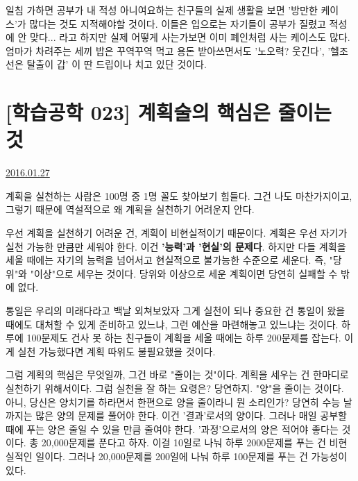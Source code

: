 일침 가하면 공부가 내 적성 아니여요하는 친구들의 실제 생활을 보면 '방만한 케이스'가 많다는 것도 지적해야할 것이다.
이들은 입으로는 자기들이 공부가 질렸고 적성에 안 맞다... 라고 하지만 실제 어떻게 사는가보면 이미 폐인처럼 사는 케이스도 많다.
엄마가 차려주는 세끼 밥은 꾸역꾸역 먹고 용돈 받아쓰면서도 '노오력? 웃긴다', '헬조선은 탈출이 갑' 이 딴 드립이나 치고 있단 것이다.
\vspace{5mm}





\section{[학습공학 023] 계획술의 핵심은 줄이는 것}
\href{https://www.kockoc.com/Apoc/611403}{2016.01.27}

\vspace{5mm}

계획을 실천하는 사람은 100명 중 1명 꼴도 찾아보기 힘들다.
그건 나도 마찬가지이고, 그렇기 때문에 역설적으로 왜 계획을 실천하기 어려운지 안다.
\vspace{5mm}

우선 계획을 실천하기 어려운 건, 계획이 비현실적이기 때문이다.
계획은 우선 자기가 실천 가능한 만큼만 세워야 한다. 이건 \textbf{'능력'과 '현실'의 문제다}.
하지만 다들 계획을 세울 때에는 자기의 능력을 넘어서고 현실적으로 불가능한 수준으로 세운다.
즉, "당위"와 "이상"으로 세우는 것이다.
당위와 이상으로 세운 계획이면 당연히 실패할 수 밖에 없다.
\vspace{5mm}

통일은 우리의 미래다라고 백날 외쳐보았자 그게 실천이 되나
중요한 건 통일이 왔을 때에도 대처할 수 있게 준비하고 있느냐, 그런 예산을 마련해놓고 있느냐는 것이다.
하루에 100문제도 건사 못 하는 친구들이 계획을 세울 때에는 하루 200문제를 잡는다.
이게 실천 가능했다면 계획 따위도 불필요했을 것이다.
\vspace{5mm}

그럼 계획의 핵심은 무엇일까, 그건 바로 "줄이는 것"이다.
계획을 세우는 건 한마디로 실천하기 위해서이다. 그럼 실천을 잘 하는 요령은?
당연하지. "양"을 줄이는 것이다.
아니, 당신은 양치기를 하라면서 한편으로 양을 줄이라니 뭔 소리인가?
당연히 수능 날까지는 많은 양의 문제를 풀어야 한다. 이건 '결과'로서의 양이다.
그러나 매일 공부할 때에 푸는 양은 줄일 수 있을 만큼 줄여야 한다. '과정'으로서의 양은 적어야 좋다는 것이다.
총 20,000문제를 푼다고 하자. 이걸 10일로 나눠 하루 2000문제를 푸는 건 비현실적인 일이다.
그러나 20,000문제를 200일에 나눠 하루 100문제를 푸는 건 가능성이 있다.
\vspace{5mm}

